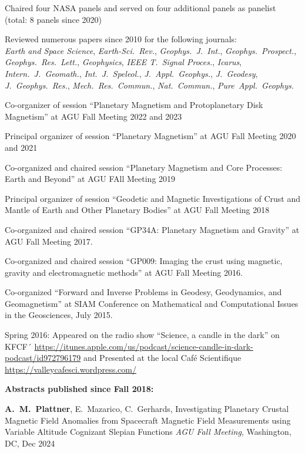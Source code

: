 \documentclass[10pt]{article}
\begin{document}
\spcp
Chaired four NASA panels and served on four
additional panels as panelist (total: 8 panels since 2020)

\spcp
Reviewed numerous papers since 2010 for the following journals:\\
\emph{Earth and Space Science},
\emph{Earth-Sci.~Rev.},
\emph{Geophys.~J.~Int.},
\emph{Geophys.~Prospect.},
\emph{Geophys.~Res.~Lett.},
\emph{Geophysics},
\emph{IEEE T.~Signal Proces.},
\emph{Icarus},
\emph{Intern.~J.~Geomath.},
\emph{Int.~J.~Speleol.},
\emph{J.~Appl.~Geophys.},
\emph{J.~Geodesy},
\emph{J.~Geophys.~Res.},
\emph{Mech.~Res.~Commun.},
\emph{Nat.~Commun.},
\emph{Pure~Appl.~Geophys.}

\spcp
Co-organizer of session ``Planetary Magnetism and Protoplanetary Disk Magnetism'' at AGU Fall Meeting 2022 and 2023

\spcp
Principal organizer of session ``Planetary Magnetism'' at AGU Fall Meeting 2020 and 2021

\spcp Co-organized and chaired session ``Planetary Magnetism
and Core Processes: Earth and Beyond'' at AGU FAll Meeting 2019

\spcp Principal organizer of session ``Geodetic and Magnetic
Investigations of Crust and Mantle of Earth and Other Planetary
Bodies'' at AGU Fall Meeting 2018

\spcp
Co-organized and chaired session
``GP34A: Planetary Magnetism and Gravity''
at AGU Fall Meeting 2017.
          
\spcp
Co-organized and chaired session
``GP009: Imaging the crust using magnetic, gravity and electromagnetic methods''
at AGU Fall Meeting 2016.

\spcp Co-organized ``Forward and Inverse Problems in Geodesy,
Geodynamics, and Geomagnetism'' at SIAM Conference on Mathematical and
Computational Issues in the Geosciences, July 2015.

\spcp
Spring 2016: Appeared on the radio show ``Science, a candle in the dark'' on KFCF´
\url{https://itunes.apple.com/us/podcast/science-candle-in-dark-podcast/id972796179} and Presented at the local Caf\'e Scientifique \url{https://valleycafesci.wordpress.com/}


\spc
\textbf{\tsize Abstracts published since Fall 2018:}

\spcp
\textbf{A.\ M.\ Plattner}, E.\ Mazarico, C.\ Gerhards, Investigating
Planetary Crustal Magnetic Field Anomalies from Spacecraft Magnetic
Field Measurements using Variable Altitude Cognizant Slepian Functions
\emph{AGU Fall Meeting}, Washington, DC, Dec 2024
\end{document}
